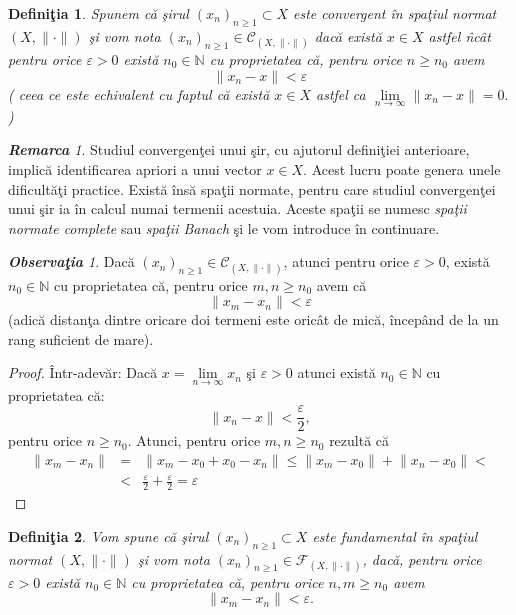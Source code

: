 \documentclass[ a4paper, 12pt]{report}
\newtheorem{definition}{\bf Defini\c tia}[section]
\theoremstyle{remark}
\newtheorem{remarc}{\bf Remarca}[section]
\newtheorem{obs}{\bf Observa\c tia }[section]
\numberwithin{equation}{section}
\begin{document}
\begin{definition}
Spunem c\u a \c sirul $(x_n)_{n \geq 1} \subset X$ este convergent \^in spa\c tiul normat $(X, \lVert \cdot \rVert)$ \c si vom nota $(x_n)_{n \geq 1} \in \mathcal{C}_{(X, \lVert \cdot \rVert)}$ dac\u a exist\u a $ x \in X$ astfel \^nc\^ at pentru orice $\varepsilon>0$  exist\u a $n_0 \in \mathbb{N}$ cu proprietatea c\u a,   pentru orice $n \geq n_0$ avem
 $$\lVert x_n - x \rVert < \varepsilon$$ ( ceea ce este echivalent cu faptul c\u a exist\u a $x \in X$ astfel ca $\lim\limits_{n \to \infty}\lVert x_n - x \rVert = 0.$)
\end{definition}
\begin{remarc}
Studiul convergen\c tei unui \c sir, cu ajutorul defini\c tiei anterioare, implic\u a identificarea  apriori a unui vector $x \in X$.
Acest lucru poate genera unele dificult\u a\c ti practice. Exist\u a \^ins\u a spa\c tii normate, pentru care studiul convergen\c tei unui \c sir ia \^in calcul numai termenii acestuia. Aceste spa\c tii se numesc \emph{spa\c tii normate complete} sau \emph{spa\c tii Banach} \c si le vom introduce \^in continuare.
\end{remarc}
\begin{obs}
Dac\u a $(x_n)_{n \geq 1} \in \mathcal{C}_{(X, \lVert \cdot \rVert)}$, atunci pentru orice $\varepsilon >0$, exist\u a $n_0 \in \mathbb{N}$ cu proprietatea c\u a, pentru orice $ m,n \geq n_0$  avem c\u  a 
$$\lVert x_m - x_n \rVert < \varepsilon $$ (adic\u a distan\c ta dintre oricare doi termeni este oric\^at de mic\u a, \^incep\^and de la un rang suficient de mare).
\end{obs}
\begin{proof}
\^Intr-adev\u ar: Dac\u a  $x = \lim\limits_{n \rightarrow \infty} x_n$ \c si $\varepsilon>0$ atunci exist\u a $n_0 \in \mathbb{N}$ cu proprietatea c\u a:
$$\lVert x_n - x \rVert < \frac{\varepsilon}{2},$$ pentru orice $n \geq n_0$. Atunci, pentru orice $m,n \geq n_0$ rezult\u a c\u a
\begin{eqnarray*}
\lVert x_m - x_n \rVert &=& \lVert x_m - x_0+x_0-x_n \rVert  \leq \lVert x_m - x_0 \rVert +  \lVert x_n - x_0 \rVert  < \\
&<& \frac{\varepsilon}{2}+\frac{\varepsilon}{2} = \varepsilon
\end{eqnarray*}
\end{proof}
\begin{definition}
Vom spune c\u a \c sirul $(x_n)_{n \geq 1} \subset X$ este fundamental \^in spa\c tiul normat $(X, \lVert \cdot \rVert)$ \c si vom nota $(x_n)_{n \geq 1} \in \mathcal{F}_{(X, \lVert \cdot \rVert)}$, dac\u a, pentru orice $\varepsilon >0$ exist\u a $n_0 \in \mathbb{N}$ cu proprietatea c\u a, pentru orice $n,m \geq n_0$ avem 
$$\lVert x_m - x_n \rVert < \varepsilon.$$
\end{definition}
\end{document}
